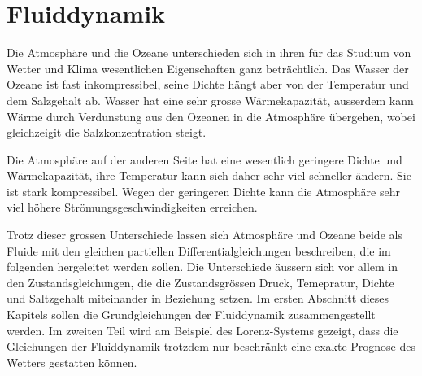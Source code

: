 %
%
%
\chapter{Fluiddynamik\label{chapter:fluiddynamik}}
\rhead{}
Die Atmosphäre und die Ozeane unterschieden sich in ihren
für das Studium von Wetter und Klima wesentlichen Eigenschaften
ganz beträchtlich.
Das Wasser der Ozeane ist fast inkompressibel, seine Dichte hängt aber
von der Temperatur und dem Salzgehalt ab.
Wasser hat eine sehr grosse Wärmekapazität, ausserdem kann Wärme durch
Verdunstung aus den Ozeanen in die Atmosphäre übergehen, wobei gleichzeigit
die Salzkonzentration steigt.

Die Atmosphäre auf der anderen Seite hat eine wesentlich geringere
Dichte und Wärmekapazität, ihre Temperatur kann sich daher sehr viel
schneller ändern.
Sie ist stark kompressibel.
Wegen der geringeren Dichte kann die Atmosphäre sehr viel höhere
Strömungsgeschwindigkeiten erreichen.

Trotz dieser grossen Unterschiede lassen sich Atmosphäre und Ozeane
beide als Fluide mit den gleichen partiellen Differentialgleichungen
beschreiben, die im folgenden hergeleitet werden sollen.
Die Unterschiede äussern sich vor allem in den Zustandsgleichungen,
die die Zustandsgrössen Druck, Temepratur, Dichte und Saltzgehalt
miteinander in Beziehung setzen.
Im ersten Abschnitt dieses Kapitels sollen die Grundgleichungen
der Fluiddynamik zusammengestellt werden.
Im zweiten Teil wird am Beispiel des Lorenz-Systems gezeigt, dass
die Gleichungen der Fluiddynamik trotzdem nur beschränkt eine exakte
Prognose des Wetters gestatten können.








